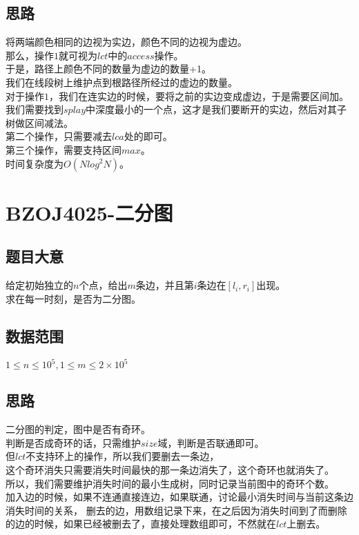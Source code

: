 \documentclass{ctexart}
\numberwithin{equation}{section}
\begin{document}
\begin{flushleft}
  \subsection{思路}
  将两端颜色相同的边视为实边，颜色不同的边视为虚边。\\
  那么，操作$1$就可视为$lct$中的$access$操作。\\
  于是，路径上颜色不同的数量为虚边的数量+1。\\
  我们在线段树上维护点到根路径所经过的虚边的数量。\\
  对于操作$1$，我们在连实边的时候，要将之前的实边变成虚边，于是需要区间加。\\
  我们需要找到$splay$中深度最小的一个点，这才是我们要断开的实边，然后对其子树做区间减法。\\
  第二个操作，只需要减去$lca$处的即可。\\
  第三个操作，需要支持区间$max$。\\
  时间复杂度为$O(Nlog^2N)$。\\
  \newpage   
  
  \section{BZOJ4025-二分图}
  \subsection{题目大意}
  给定初始独立的$n$个点，给出$m$条边，并且第$i$条边在$[l_i,r_i]$出现。\\
  求在每一时刻，是否为二分图。\\
  \subsection{数据范围}
  $1\le n\le 10^5,1\le m\le 2\times 10^5$
  \subsection{思路}
  二分图的判定，图中是否有奇环。\\
  判断是否成奇环的话，只需维护$size$域，判断是否联通即可。\\
  但$lct$不支持环上的操作，所以我们要删去一条边，\\
  这个奇环消失只需要消失时间最快的那一条边消失了，这个奇环也就消失了。\\
  所以，我们需要维护消失时间的最小生成树，同时记录当前图中的奇环个数。\\
  加入边的时候，如果不连通直接连边，如果联通，讨论最小消失时间与当前这条边消失时间的关系，
  删去的边，用数组记录下来，在之后因为消失时间到了而删除的边的时候，如果已经被删去了，直接处理数组即可，不然就在$lct$上删去。\\
  \newpage 


\end{flushleft}
\end{document}
